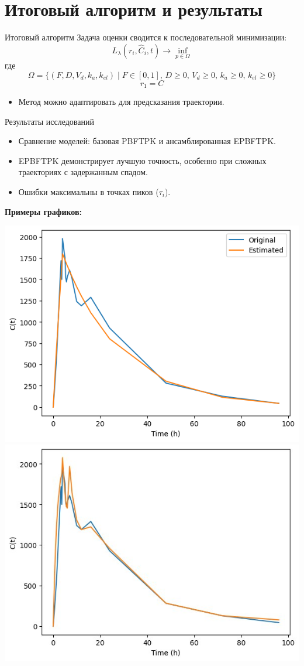 \documentclass{beamer}
\begin{document}
\section{Итоговый алгоритм и результаты}
\begin{frame}{Итоговый алгоритм}
	Задача оценки сводится к последовательной минимизации:
	\[
		L_{\lambda}(r_i, \hat{C}_i, t) \to \inf_{p \in \Omega}
	\]
	где
	\[
		\Omega = \{ (F, D, V_d, k_a, k_{el}) \mid F \in [0,1],\, D \ge 0,\, V_d \ge 0,\, k_a \ge 0,\, k_{el} \ge 0 \}
	\]
	\[
		r_1 = C
	\]
	\begin{itemize}
		\item Метод можно адаптировать для предсказания траектории.
	\end{itemize}
\end{frame}

\begin{frame}{Результаты исследований}
	\begin{itemize}
		\item Сравнение моделей: базовая PBFTPK и ансамблированная EPBFTPK.
		\item EPBFTPK демонстрирует лучшую точность, особенно при сложных траекториях с задержанным спадом.
		\item Ошибки максимальны в точках пиков (\(\tau_i\)).
	\end{itemize}
	\begin{center}
		\small
		\textbf{Примеры графиков:}
		\vspace{0.5em}

		\includegraphics[width=0.4\linewidth]{results/basic_1.png} \quad
		\includegraphics[width=0.4\linewidth]{results/1.jpg}
	\end{center}
\end{frame}
\end{document}
